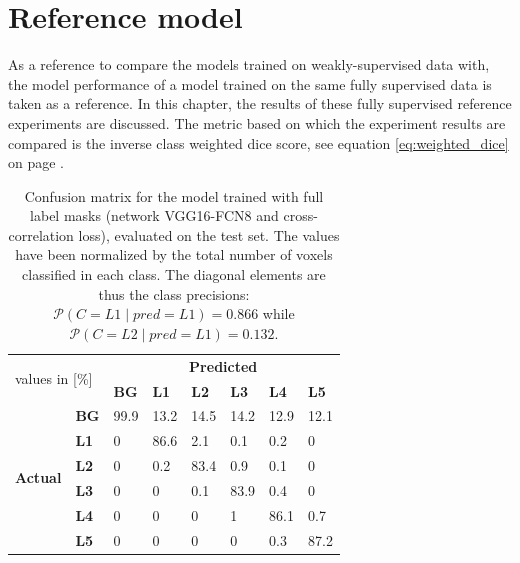 \chapter{Reference model\label{sec:reference_model}}\thispagestyle{empty}
\par{
    As a reference to compare the models trained on weakly-supervised data with, the model performance of a model trained on the same fully supervised data is taken as a reference.
    In this chapter, the results of these fully supervised reference experiments are discussed.
    The metric based on which the experiment results are compared is the inverse class weighted dice score, see equation \ref{eq:weighted_dice} on page \pageref{eq:weighted_dice}.
}
\begin{table}
 

\begin{tabular}{cl|llllll}
    \toprule
    \multicolumn{2}{l|}{\multirow{2}{*}{values in {[}\%{]}}} & \multicolumn{6}{c}{\textbf{Predicted}}                                            \\
    \multicolumn{2}{l|}{}                                    & \textbf{BG} & \textbf{L1} & \textbf{L2} & \textbf{L3} & \textbf{L4} & \textbf{L5} \\ \hline
    \multirow{6}{*}{\textbf{Actual}}      & \textbf{BG}      & 99.9        & 13.2        & 14.5        & 14.2        & 12.9        & 12.1        \\
     & \textbf{L1} & 0 & 86.6 & 2.1  & 0.1  & 0.2  & 0    \\
     & \textbf{L2} & 0 & 0.2  & 83.4 & 0.9  & 0.1  & 0    \\
     & \textbf{L3} & 0 & 0    & 0.1  & 83.9 & 0.4  & 0    \\
     & \textbf{L4} & 0 & 0    & 0    & 1    & 86.1 & 0.7  \\
     & \textbf{L5} & 0 & 0    & 0    & 0    & 0.3  & 87.2 \\ \bottomrule
    \end{tabular}

    \caption{Confusion matrix for the model trained with full label masks (network VGG16-FCN8 and cross-correlation loss), evaluated on the test set.
    The values have been normalized by the total number of voxels classified in each class.
    The diagonal elements are thus the class precisions: $\mathcal{P}(C = L1 \mid pred = L1) = 0.866$ while $\mathcal{P}(C = L2 \mid pred = L1) = 0.132$.
    \label{tab:full_confusionMatrix}
    }
\end{table}

